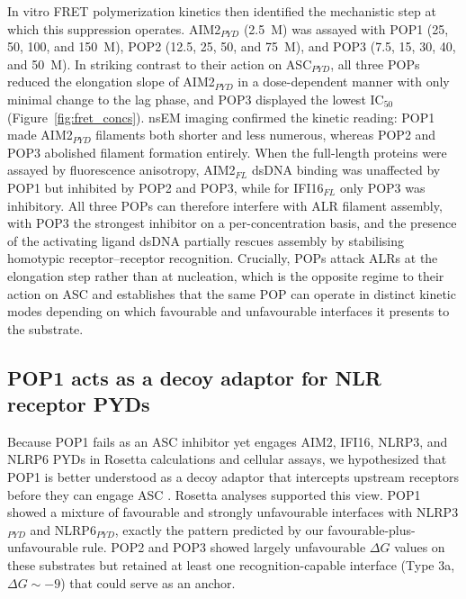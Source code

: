 \documentclass[11pt]{article}
\begin{document}
In vitro FRET polymerization kinetics then identified the mechanistic
step at which this suppression operates. AIM2$_{PYD}$ (2.5~\textmu M)
was assayed with POP1 (25, 50, 100, and 150~\textmu M), POP2 (12.5, 25,
50, and 75~\textmu M), and POP3 (7.5, 15, 30, 40, and 50~\textmu M).
In striking contrast to their action on ASC$_{PYD}$, all three POPs
reduced the elongation slope of AIM2$_{PYD}$ in a dose-dependent manner
with only minimal change to the lag phase, and POP3 displayed the lowest
IC$_{50}$ (Figure~\ref{fig:fret_concs}). nsEM imaging confirmed the
kinetic reading: POP1 made AIM2$_{PYD}$ filaments both shorter and
less numerous, whereas POP2 and POP3 abolished filament formation
entirely. When the full-length proteins were assayed by fluorescence
anisotropy, AIM2$_{FL}$ dsDNA binding was unaffected by POP1 but
inhibited by POP2 and POP3, while for IFI16$_{FL}$ only POP3 was
inhibitory. All three POPs can therefore interfere with ALR filament
assembly, with POP3 the strongest inhibitor on a per-concentration
basis, and the presence of the activating ligand dsDNA partially
rescues assembly by stabilising homotypic receptor--receptor
recognition. Crucially, POPs attack ALRs at the elongation step rather
than at nucleation, which is the opposite regime to their action on
ASC and establishes that the same POP can operate in distinct kinetic
modes depending on which favourable and unfavourable interfaces it
presents to the substrate.

\subsection{POP1 acts as a decoy adaptor for NLR receptor PYDs}

Because POP1 fails as an ASC inhibitor yet engages AIM2, IFI16, NLRP3,
and NLRP6 PYDs in Rosetta calculations and cellular assays, we
hypothesized that POP1 is better understood as a decoy adaptor that
intercepts upstream receptors before they can engage ASC
\citep{lu2014unified}. Rosetta analyses supported this view. POP1 showed
a mixture of favourable and strongly unfavourable interfaces with
NLRP3$_{PYD}$ and NLRP6$_{PYD}$, exactly the pattern predicted by our
favourable-plus-unfavourable rule. POP2 and POP3 showed largely
unfavourable $\Delta G$ values on these substrates but retained at least
one recognition-capable interface (Type 3a, $\Delta G \sim -9$) that
could serve as an anchor.
\end{document}
